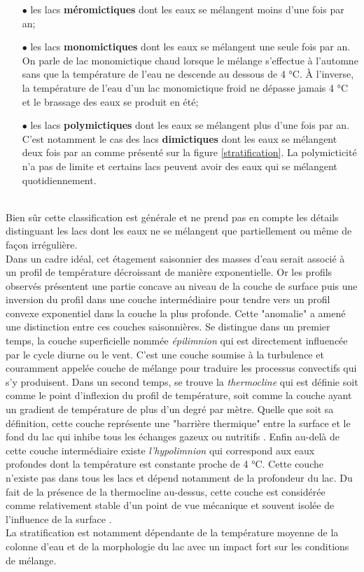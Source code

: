 \begin{itemize}
\item[$\bullet$] les lacs \textbf{méromictiques} dont les eaux se mélangent moins d'une fois par an;

\item[$\bullet$] les lacs \textbf{monomictiques} dont les eaux se mélangent une seule fois par an. On parle de lac monomictique chaud lorsque le mélange s'effectue à l'automne sans que la température de l'eau ne descende au dessous de 4 °C. À l'inverse, la température de l'eau d'un lac monomictique froid ne dépasse jamais 4 °C et le brassage des eaux se produit en été;

\item[$\bullet$] les lacs \textbf{polymictiques} dont les eaux se mélangent plus d'une fois par an. C'est notamment le cas des lacs \textbf{dimictiques} dont les eaux se mélangent deux fois par an comme présenté sur la figure \ref{stratification}. La polymicticité n'a pas de limite et certains lacs peuvent avoir des eaux qui se mélangent quotidiennement.
\end{itemize}
~\\
Bien sûr cette classification est générale et ne prend pas en compte les détails distinguant les lacs dont les eaux ne se mélangent que partiellement ou même de façon irrégulière.\\

\noindent Dans un cadre idéal, cet étagement saisonnier des masses d'eau serait associé à un profil de température décroissant de manière exponentielle. Or les profils observés présentent une partie concave au niveau de la couche de surface puis une inversion du profil dans une couche intermédiaire pour tendre vers un profil convexe exponentiel dans la couche la plus profonde. Cette "anomalie" a amené une distinction entre ces couches saisonnières. Se distingue dans un premier temps, la couche superficielle nommée \textit{épilimnion} qui est directement influencée par le cycle diurne ou le vent. C'est une couche soumise à la turbulence et couramment appelée couche de mélange pour traduire les processus convectifs qui s'y produisent. Dans un second temps, se trouve la \textit{thermocline} qui est définie soit comme le point d'inflexion du profil de température, soit comme la couche ayant un gradient de température de plus d'un degré par mètre. Quelle que soit sa définition, cette couche représente une "barrière thermique" entre la surface et le fond du lac qui inhibe tous les échanges gazeux ou nutritifs \citep{shimoda2011}. Enfin au-delà de cette couche intermédiaire existe \textit{l'hypolimnion} qui correspond aux eaux profondes dont la température est constante proche de 4 °C. Cette couche n'existe pas dans tous les lacs et dépend notamment de la profondeur du lac. Du fait de la présence de la thermocline au-dessus, cette couche est considérée comme relativement stable d'un point de vue mécanique et souvent isolée de l'influence de la surface \citep{wetzel1983}.\\
La stratification est notamment dépendante de la température moyenne de la colonne d'eau \citep{lewis1996,kraemer2015} et de la morphologie du lac \citep{macintyre2010,butcher2015} avec un impact fort sur les conditions de mélange.


